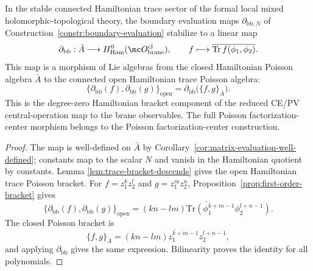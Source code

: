 \documentclass[11pt]{memoir}
\begin{document}
\begin{thm}\label{thm:bulk-boundary}
  In the stable connected Hamiltonian trace sector of the formal local mixed
  holomorphic-topological theory, the boundary evaluation maps
  $\partial_{\mathrm{bb},N}$ of Construction~\ref{constr:boundary-evaluation}
  stabilize to a linear map
  $$\partial_{\mathrm{bb}}:\bar A\longrightarrow
    H^0_{\mathrm{Ham}}(\mc O_{\mathrm{brane}}^{\mathrm{cl}}),\qquad
    f\longmapsto \overline{\mathrm{Tr}\,f(\phi_1,\phi_2)}.$$
  This map is a morphism of Lie algebras from the closed Hamiltonian Poisson
  algebra $\bar A$ to the connected open Hamiltonian trace Poisson algebra:
  $$\{\partial_{\mathrm{bb}}(f),\partial_{\mathrm{bb}}(g)\}_{\mathrm{open}}
    =\partial_{\mathrm{bb}}\bigl(\{f,g\}_{\bar A}\bigr).$$
  This is the degree-zero Hamiltonian bracket component of the reduced
  CE/PV central-operation map to the brane observables. The
	  full Poisson factorization-center morphism belongs to the Poisson
	  factorization-center construction.
\end{thm}

\begin{proof}
  The map is well-defined on $\bar A$ by
  Corollary~\ref{cor:matrix-evaluation-well-defined}; constants map to the
  scalar $N$ and vanish in the Hamiltonian quotient by constants. Lemma
  \ref{lem:trace-bracket-descends} gives the open Hamiltonian trace Poisson
  bracket. For
  $f=z_1^kz_2^l$ and $g=z_1^mz_2^n$, Proposition~\ref{prop:first-order-bracket}
  gives
  $$\{\partial_{\mathrm{bb}}(f),\partial_{\mathrm{bb}}(g)\}_{\mathrm{open}}
    =\overline{(kn-lm)\mathrm{Tr}
      (\phi_1^{k+m-1}\phi_2^{l+n-1})}.$$
  The closed Poisson bracket is
  $$\{f,g\}_{\bar A}=\overline{(kn-lm)z_1^{k+m-1}z_2^{l+n-1}},$$
  and applying $\partial_{\mathrm{bb}}$ gives the same expression. Bilinearity
  proves the identity for all polynomials.
\end{proof}
\end{document}
